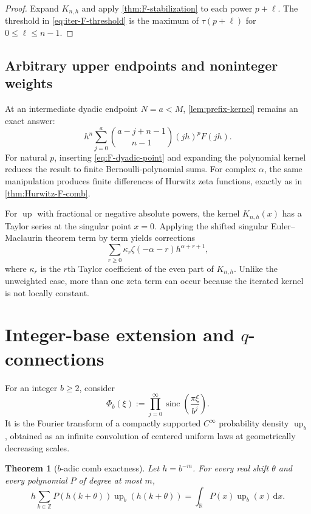 \documentclass[11pt]{article}
\newtheorem{theorem}{Theorem}[section]
\theoremstyle{definition}
\DeclareMathOperator{\sinc}{sinc}
\newcommand{\Up}{\operatorname{up}}
\newcommand{\dd}{\,\mathrm{d}}
\newcommand{\Z}{\mathbb{Z}}
\newcommand{\R}{\mathbb{R}}
\begin{document}
\begin{proof}
Expand $K_{n,h}$ and apply \cref{thm:F-stabilization} to each power
$p+\ell$.  The threshold in \eqref{eq:iter-F-threshold} is the maximum of
$\tau(p+\ell)$ for $0\le\ell\le n-1$.
\end{proof}

\subsection{Arbitrary upper endpoints and noninteger weights}

At an intermediate dyadic endpoint $N=a<M$, \cref{lem:prefix-kernel} remains
an exact answer:
\[
 h^n\sum_{j=0}^{a}\binom{a-j+n-1}{n-1}(jh)^pF(jh).
\]
For natural $p$, inserting \eqref{eq:F-dyadic-point} and expanding the
polynomial kernel reduces the result to finite Bernoulli-polynomial sums.  For
complex $\alpha$, the same manipulation produces finite differences of
Hurwitz zeta functions, exactly as in \cref{thm:Hurwitz-F-comb}.

For $\Up$ with fractional or negative absolute powers, the kernel
$K_{n,h}(x)$ has a Taylor series at the singular point $x=0$.  Applying the
shifted singular Euler--Maclaurin theorem term by term yields corrections
\[
 \sum_{r\ge0} \kappa_r\zeta(-\alpha-r)h^{\alpha+r+1},
\]
where $\kappa_r$ is the $r$th Taylor coefficient of the even part of
$K_{n,h}$.  Unlike the unweighted case, more than one zeta term can occur
because the iterated kernel is not locally constant.

\section{Integer-base extension and \texorpdfstring{$q$}{q}-connections}
\label{sec:base-b}

For an integer $b\ge2$, consider
\begin{equation}
 \Phi_b(\xi):=\prod_{j=0}^{\infty}
 \sinc\!\left(\frac{\pi\xi}{b^j}\right).
 \label{eq:Phi-b}
\end{equation}
It is the Fourier transform of a compactly supported $C^\infty$ probability
density $\Up_b$, obtained as an infinite convolution of centered uniform
laws at geometrically decreasing scales.

\begin{theorem}[$b$-adic comb exactness]
\label{thm:b-adic}
Let $h=b^{-m}$.  For every real shift $\theta$ and every polynomial $P$ of
degree at most $m$,
\begin{equation}
 h\sum_{k\in\Z}P(h(k+\theta))\Up_b(h(k+\theta))
 =\int_{\R}P(x)\Up_b(x)\dd x.
 \label{eq:b-adic-exactness}
\end{equation}
\end{theorem}
\end{document}

